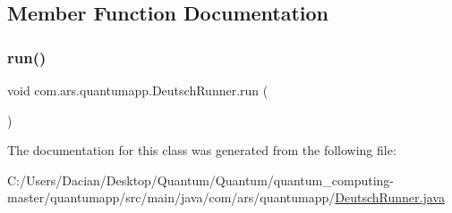 \subsection{Member Function Documentation}
\hypertarget{classcom_1_1ars_1_1quantumapp_1_1_deutsch_runner_a8dbef89cef296d4bb392f303e7c7ed85}{}\label{classcom_1_1ars_1_1quantumapp_1_1_deutsch_runner_a8dbef89cef296d4bb392f303e7c7ed85} 
\subsubsection{\texorpdfstring{run()}{run()}}
{\footnotesize\ttfamily void com.\+ars.\+quantumapp.\+Deutsch\+Runner.\+run (\begin{DoxyParamCaption}{ }\end{DoxyParamCaption})}



The documentation for this class was generated from the following file\+:\begin{DoxyCompactItemize}
\item 
C\+:/\+Users/\+Dacian/\+Desktop/\+Quantum/\+Quantum/quantum\+\_\+computing-\/master/quantumapp/src/main/java/com/ars/quantumapp/\hyperlink{_deutsch_runner_8java}{Deutsch\+Runner.\+java}\end{DoxyCompactItemize}
